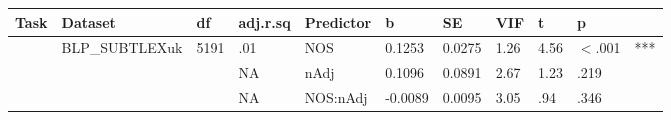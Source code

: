 \begin{table}[ht]
\centering
\begingroup\normalsize
\begin{tabular}{lllllllllll}
  \hline
Task & Dataset & df & adj.r.sq & Predictor & b & SE & VIF & t & p &  \\ 
  \hline
 & BLP\_SUBTLEXuk & 5191 & .01 & NOS & 0.1253 & 0.0275 & 1.26 & 4.56 & $<$.001 & *** \\ 
   &  &  & NA & nAdj & 0.1096 & 0.0891 & 2.67 & 1.23 & .219 &   \\ 
   &  &  & NA & NOS:nAdj & -0.0089 & 0.0095 & 3.05 & .94 & .346 &   \\ 
   \hline
\end{tabular}
\endgroup
\end{table}
